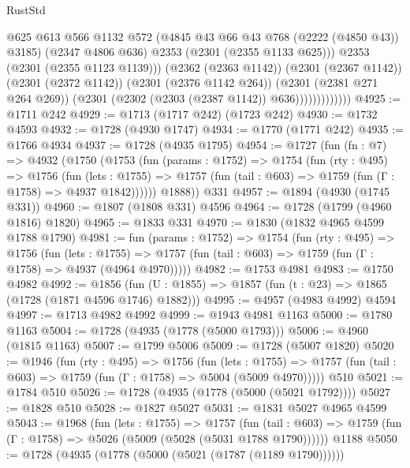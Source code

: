 \begin{lexlean}{RustStd}
\begin{coremodule}
{\begin{coremodule}
{{{{{{{{{{{{{                              @625
                              @613
                              @566
                              @1132
                              @572
                              (@4845 @43 @66 @43 @768 (@2222 (@4850 @43)) @3185)
                              (@2347 @4806 @636)
                              @2353
                              (@2301 (@2355 @1133 @625)))
                            @2353
                            (@2301 (@2355 @1123 @1139)))
                          (@2362 (@2363 @1142))
                          (@2301 (@2367 @1142))
                          (@2301 (@2372 @1142))
                          (@2301 (@2376 @1142 @264))
                          (@2301 (@2381 @271 @264 @269))
                          (@2301 (@2302 (@2303 (@2387 @1142)) @636)))))))))))))
@4925 := @1711 @242
@4929 := @1713 (@1717 @242) (@1723 @242)
@4930 := @1732 @4593
@4932 := @1728 (@4930 @1747)
@4934 := @1770 (@1771 @242)
@4935 := @1766 @4934
@4937 := @1728 (@4935 @1795)
@4954 := @1727
    (fun (fn : @7) =>
    @4932
      (@1750
        (@1753
          (fun (params : @1752) =>
          @1754
            (fun (rty : @495) =>
            @1756
              (fun (lets : @1755) =>
              @1757 (fun (tail : @603) => @1759 (fun (Γ : @1758) => @4937 @1842))))))
        @1888))
    @331
@4957 := @1894 (@4930 (@1745 @331))
@4960 := @1807 (@1808 @331) @4596
@4964 := @1728 (@1799 (@4960 @1816) @1820)
@4965 := @1833 @331
@4970 := @1830 (@1832 @4965 @4599 @1788 @1790)
@4981 := fun (params : @1752) =>
  @1754
    (fun (rty : @495) =>
    @1756
      (fun (lets : @1755) =>
      @1757 (fun (tail : @603) => @1759 (fun (Γ : @1758) => @4937 (@4964 @4970)))))
@4982 := @1753 @4981
@4983 := @1750 @4982
@4992 := @1856 (fun (U : @1855) => @1857 (fun (t : @23) => @1865 (@1728 (@1871 @4596 @1746) @1882)))
@4995 := @4957 (@4983 @4992) @4594
@4997 := @1713 @4982 @4992
@4999 := @1943 @4981 @1163
@5000 := @1780 @1163
@5004 := @1728 (@4935 (@1778 (@5000 @1793)))
@5006 := @4960 (@1815 @1163)
@5007 := @1799 @5006
@5009 := @1728 (@5007 @1820)
@5020 := @1946
    (fun (rty : @495) =>
    @1756
      (fun (lets : @1755) =>
      @1757 (fun (tail : @603) => @1759 (fun (Γ : @1758) => @5004 (@5009 @4970)))))
    @510
@5021 := @1784 @510
@5026 := @1728 (@4935 (@1778 (@5000 (@5021 @1792))))
@5027 := @1828 @510
@5028 := @1827 @5027
@5031 := @1831 @5027 @4965 @4599
@5043 := @1968
    (fun (lets : @1755) =>
    @1757
      (fun (tail : @603) => @1759 (fun (Γ : @1758) => @5026 (@5009 (@5028 (@5031 @1788 @1790))))))
    @1188
@5050 := @1728 (@4935 (@1778 (@5000 (@5021 (@1787 (@1189 @1790))))))
}}}}}}}}}}}}}
\end{coremodule}}
\end{coremodule}
\end{lexlean}
